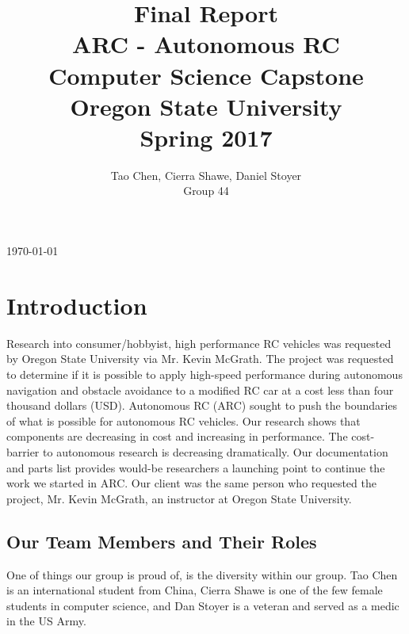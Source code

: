 \documentclass[compsoc,draftclsnofoot,onecolumn,10pt]{IEEEtran}
\date{}
\begin{document}
\begin{titlepage}
	\title{
	Final Report\\
	ARC - Autonomous RC	\\
	\Large
	Computer Science Capstone \\
	Oregon State University\\
	Spring 2017
	}
    \author{Tao Chen, Cierra Shawe, Daniel Stoyer\\ Group 44}
	\maketitle
	\begin{center}
		\today
	\end{center}

	\thispagestyle{empty} %

\end{titlepage}

\tableofcontents

\clearpage

\section{Introduction}
Research into consumer/hobbyist, high performance RC vehicles was requested by Oregon State University via Mr. Kevin McGrath.
The project was requested to determine if it is possible to apply high-speed performance during autonomous navigation and obstacle avoidance to a modified RC car at a cost less than four thousand dollars (USD).
Autonomous RC (ARC) sought to push the boundaries of what is possible for autonomous RC vehicles.
Our research shows that components are decreasing in cost and increasing in performance.
The cost-barrier to autonomous research is decreasing dramatically.
Our documentation and parts list provides would-be researchers a launching point to continue the work we started in ARC.
Our client was the same person who requested the project, Mr. Kevin McGrath, an instructor at Oregon State University.

\subsection{Our Team Members and Their Roles}
One of things our group is proud of, is the diversity within our group. Tao Chen is an international student from China, Cierra Shawe is one of the few female students in computer science, and Dan Stoyer is a veteran and served as a medic in the US Army.
\end{document}
